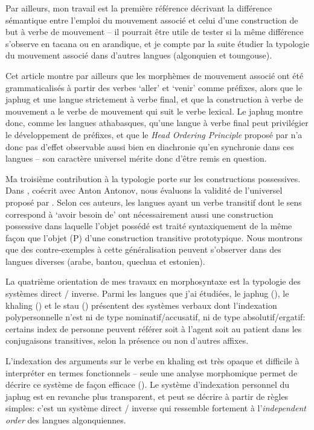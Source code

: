 \documentclass[oldfontcommands,oneside,a4paper,11pt]{article}
\begin{document}
 Par ailleurs, mon travail est la première référence décrivant la différence sémantique entre l'emploi du mouvement associé et celui d'une construction de but à verbe de mouvement -- il pourrait être utile de tester si la même différence s'observe en tacana ou en arandique, et je compte par la suite étudier la typologie du mouvement associé dans d'autres langues (algonquien et toungouse).

Cet article montre par ailleurs que les morphèmes de mouvement associé ont été grammaticalisés à partir des verbes `aller' et `venir' comme préfixes, alors que le japhug et une langue strictement à verbe final, et que la construction à verbe de mouvement a le verbe de mouvement qui suit le verbe lexical. Le japhug montre donc, comme les langues athabasques, qu'une langue à verbe final peut privilégier le développement de préfixes, et que le \textit{Head Ordering Principle} proposé par \citet{hawkins88prefixing} n'a donc pas d'effet observable aussi bien en diachronie qu'en synchronie dans ces langues -- son caractère universel mérite donc d'être remis en question. 

Ma troisième contribution à la typologie porte sur les constructions possessives. Dans \citet{antonov14need}, coécrit avec Anton Antonov, nous évaluons la validité de l'universel proposé par \citet{harves12need}. Selon ces auteurs, les langues ayant un verbe transitif dont le sens correspond à `avoir besoin de' ont nécessairement aussi une construction possessive dans laquelle l'objet possédé est traité syntaxiquement de la même façon que l'objet (P) d'une construction transitive prototypique. Nous montrons que des contre-exemples à cette généralisation peuvent s'observer dans des langues diverses (arabe, bantou, quechua et estonien). 
 
 La quatrième orientation de mes travaux en morphosyntaxe est la typologie des systèmes direct / inverse. Parmi les langues que j'ai étudiées, le japhug (\citealt{jacques10inverse}), le khaling (\citealt{jacques12khaling}) et le stau  (\citealt{jacques14rtau}) présentent des systèmes verbaux dont l'indexation polypersonnelle n'est ni de type nominatif/accusatif, ni de type absolutif/ergatif: certains index de personne  peuvent référer soit à l'agent soit au patient dans les conjugaisons transitives, selon la présence ou non d'autres affixes.
 
 L'indexation des arguments sur le verbe en khaling est très opaque et difficile à interpréter en termes fonctionnels -- seule une analyse morphomique permet de décrire ce système de façon efficace (\citealt{walther14compactness}). Le système d'indexation personnel du  japhug est en revanche plus transparent, et peut se décrire à partir de règles simples: c'est un système direct / inverse qui ressemble fortement à l'\textit{independent order} des langues algonquiennes.  
 
\end{document}
